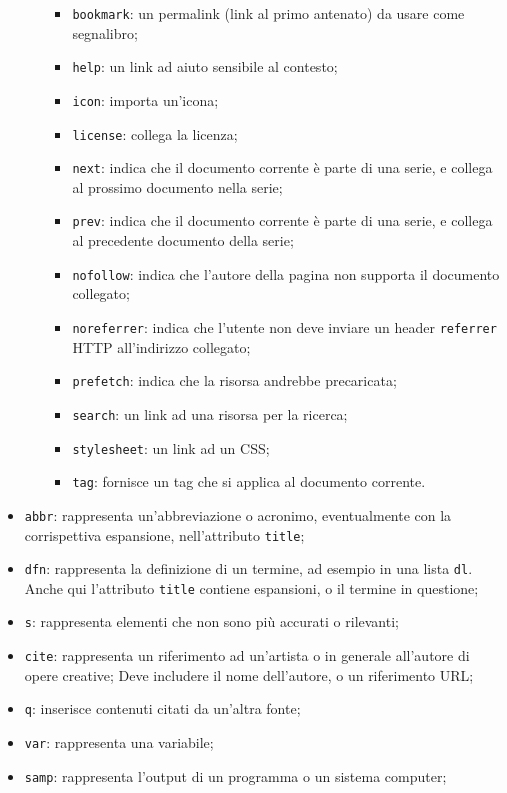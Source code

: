 \documentclass[a4paper,11pt]{article}
\begin{document}
\begin{itemize}
\begin{itemize}
\begin{itemize}
					\item \lstinline|bookmark|: un permalink (link al primo antenato) da usare come segnalibro;
					\item \lstinline|help|: un link ad aiuto sensibile al contesto;
					\item \lstinline|icon|: importa un'icona;
					\item \lstinline|license|: collega la licenza;
					\item \lstinline|next|: indica che il documento corrente è parte di una serie, e collega al prossimo documento nella serie;
					\item \lstinline|prev|: indica che il documento corrente è parte di una serie, e collega al precedente documento della serie;
					\item \lstinline|nofollow|: indica che l'autore della pagina non supporta il documento collegato;
					\item \lstinline|noreferrer|: indica che l'utente non deve inviare un header \lstinline|referrer| HTTP all'indirizzo collegato;
					\item \lstinline|prefetch|: indica che la risorsa andrebbe precaricata;
					\item \lstinline|search|: un link ad una risorsa per la ricerca;
					\item \lstinline|stylesheet|: un link ad un CSS;
					\item \lstinline|tag|: fornisce un tag che si applica al documento corrente.
				\end{itemize}
		\end{itemize}
	\item \lstinline|abbr|: rappresenta un'abbreviazione o acronimo, eventualmente con la corrispettiva espansione, nell'attributo \lstinline|title|;
	\item \lstinline|dfn|: rappresenta la definizione di un termine, ad esempio in una lista \lstinline|dl|.
		Anche qui l'attributo \lstinline|title| contiene espansioni, o il termine in questione;
	\item \lstinline|s|: rappresenta elementi che non sono più accurati o rilevanti;
	\item \lstinline|cite|: rappresenta un riferimento ad un'artista o in generale all'autore di opere creative;
		Deve includere il nome dell'autore, o un riferimento URL;
	\item \lstinline|q|: inserisce contenuti citati da un'altra fonte;
	\item \lstinline|var|: rappresenta una variabile;
	\item \lstinline|samp|: rappresenta l'output di un programma o un sistema computer;

\end{itemize}
\end{document}
